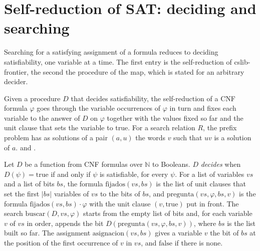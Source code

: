 \section{Self-reduction of SAT: deciding and searching}
\label{sec:search-selfreduction}

Searching for a satisfying assignment of a formula reduces to deciding satisfiability, one
variable at a time. The first entry is the self-reduction of cslib-frontier, the second the
procedure of the map, which is stated for an arbitrary decider.

\begin{definition}
  \label{def:search-cslib-selfreduce}
  \leanok
  Given a procedure $D$ that decides satisfiability, the self-reduction of a CNF formula $\varphi$
  goes through the variable occurrences of $\varphi$ in turn and fixes each variable to the answer
  of $D$ on $\varphi$ together with the values fixed so far and the unit clause that sets the
  variable to true. For a search relation $R$, the prefix problem has as solutions of a pair
  $(a, u)$ the words $v$ such that $u v$ is a solution of $a$.
   and
  .
\end{definition}

\begin{definition}
  \label{def:search-buscar}
  \leanok
  Let $D$ be a function from CNF formulas over $\mathbb{N}$ to Booleans. $D$ \emph{decides} when
  $D(\psi) = \mathrm{true}$ if and only if $\psi$ is satisfiable, for every $\psi$. For a list of
  variables $vs$ and a list of bits $bs$, the formula $\mathrm{fijados}(vs, bs)$ is the list of
  unit clauses that set the first $|bs|$ variables of $vs$ to the bits of $bs$, and
  $\mathrm{pregunta}(vs, \varphi, bs, v)$ is the formula $\mathrm{fijados}(vs, bs) \cdot \varphi$
  with the unit clause $(v, \mathrm{true})$ put in front. The search $\mathrm{buscar}(D, vs, \varphi)$
  starts from the empty list of bits and, for each variable $v$ of $vs$ in order, appends the bit
  $D(\mathrm{pregunta}(vs, \varphi, bs, v))$, where $bs$ is the list built so far. The assignment
  $\mathrm{asignacion}(vs, bs)$ gives a variable $v$ the bit of $bs$ at the position of the first
  occurrence of $v$ in $vs$, and $\mathrm{false}$ if there is none.
  \own{}
\end{definition}

